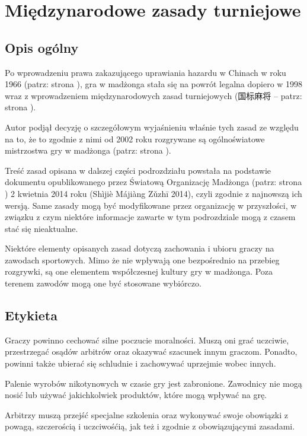 \chapter{Międzynarodowe zasady turniejowe}
\label{guobiao}
\section{Opis ogólny}
Po wprowadzeniu prawa zakazującego uprawiania hazardu w Chinach w roku 1966
(patrz: strona \pageref{zakaz_1966}), gra w madżonga stała się na powrót legalna
dopiero w 1998 wraz z wprowadzeniem międzynarodowych zasad turniejowych (国标麻将
 -- patrz: strona \pageref{relegalizacja}).

Autor podjął decyzję o szczegółowym wyjaśnieniu właśnie tych zasad ze względu na
to, że to zgodnie z nimi od 2002 roku rozgrywane są ogólnoświatowe mistrzostwa
gry w madżonga (patrz: strona \pageref{pierwsze_mistrzostwa}).

Treść zasad opisana w dalszej części podrozdziału powstała na podstawie
dokumentu opublikowanego przez Światową Organizację Madżonga (patrz: strona
\pageref{wmo}) 2 kwietnia 2014 roku (Shìjiè Májiàng Zǔzhī 2014), czyli zgodnie
z najnowszą ich wersją. Same zasady mogą być modyfikowane przez organizację w
przyszłości, w związku z czym niektóre informacje zawarte w tym podrozdziale
mogą z czasem stać się nieaktualne.

Niektóre elementy opisanych zasad dotyczą zachowania i ubioru graczy na zawodach
sportowych. Mimo że nie wpływają one bezpośrednio na przebieg rozgrywki, są one
elementem współczesnej kultury gry w madżonga. Poza terenem zawodów mogą one być
stosowane wybiórczo.

\section{Etykieta}
Graczy powinno cechować silne poczucie moralności. Muszą oni grać uczciwie,
przestrzegać osądów arbitrów oraz okazywać szacunek innym graczom. Ponadto,
powinni także ubierać się schludnie i zachowywać uprzejmie wobec innych.

Palenie wyrobów nikotynowych w czasie gry jest zabronione. Zawodnicy nie mogą
nosić lub używać jakichkolwiek produktów, które mogą wpływać na grę.

Arbitrzy muszą przejść specjalne szkolenia oraz wykonywać swoje obowiązki z
powagą, szczerością i uczciwośćią, jak też i zgodnie z obowiązującymi zasadami.

